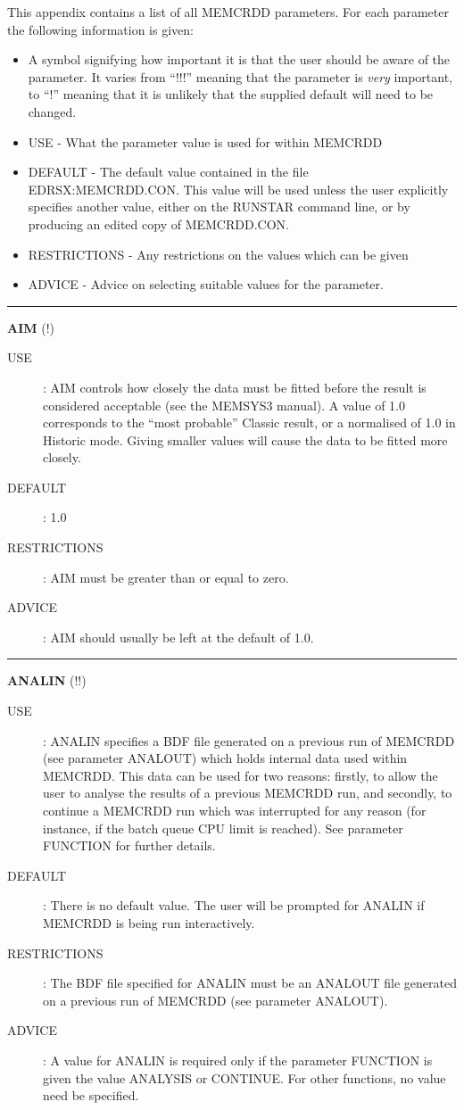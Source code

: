 This appendix contains a list of all MEMCRDD parameters. For each parameter the 
following information is given:
\begin{itemize}
\item A symbol signifying how important it is that the user should be aware
of the parameter. It varies from ``!!!'' meaning that the parameter is {\em
very} important, to ``!'' meaning that it is unlikely that the supplied default
will need to be changed. 
\item USE - What the parameter value is used for within MEMCRDD
\item DEFAULT - The default value contained in the file EDRSX:MEMCRDD.CON.
This value will be used unless the user explicitly specifies another value, 
either on the RUNSTAR command line, or by producing an edited copy of 
MEMCRDD.CON.
\item RESTRICTIONS - Any restrictions on the values which can be given
\item ADVICE - Advice on selecting suitable values for the parameter.
\end{itemize}

\rule{\textwidth}{0.3mm}
{\Large {\bf AIM } (!)}
\begin{description}
\item [USE]:
AIM controls how closely the data must be fitted before the result is 
considered acceptable (see the MEMSYS3 manual).
A value of 1.0 corresponds to the ``most
probable'' Classic result, or a normalised \chisq of 1.0 in Historic mode.
Giving smaller values will cause the data to be fitted more closely.
\item [DEFAULT]:
1.0
\item [RESTRICTIONS]:
AIM must be greater than or equal to zero.
\item [ADVICE]:
AIM should usually be left at the default of 1.0.
\end {description}


\rule{\textwidth}{0.3mm}
{\Large {\bf ANALIN} (!!)}
\begin{description}
\item [USE]:
ANALIN specifies a BDF file generated on a previous run of MEMCRDD
(see parameter ANALOUT) which holds internal data used within MEMCRDD.
This data can be used for two reasons: firstly,  to allow the user to analyse
the results of a previous MEMCRDD run, and secondly, to continue a MEMCRDD
run which was interrupted for any reason (for instance, if the batch
queue CPU limit is reached). See parameter FUNCTION for further details.
\item [DEFAULT]:
There is no default value. The user will be prompted for ANALIN if MEMCRDD
is being run interactively.
\item [RESTRICTIONS]:
The BDF file specified for ANALIN must be an ANALOUT file generated on
a previous run of MEMCRDD (see parameter ANALOUT). 
\item [ADVICE]:
A value for ANALIN is required only if the parameter FUNCTION is given the value 
ANALYSIS or CONTINUE. For other functions, no value need be specified.
\end {description}


